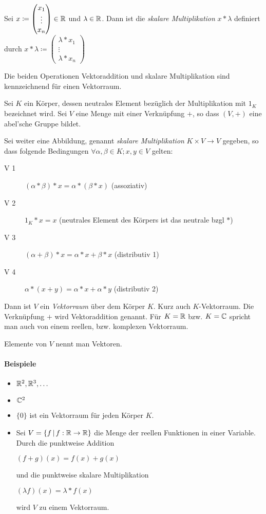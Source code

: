 Sei $x\coloneqq \begin{pmatrix}
  x_1\\
  \vdots\\
  x_n
\end{pmatrix} \in \mathbb{R}$ und $\lambda\in\mathbb{R}$. Dann ist die \emph{skalare Multiplikation} $x*\lambda$ definiert durch $x*\lambda \coloneqq \begin{pmatrix}
  \lambda* x_1\\
  \vdots\\
  \lambda* x_n
\end{pmatrix}$

Die beiden Operationen Vektoraddition und skalare Multiplikation sind kennzeichnend für einen Vektorraum.


Sei $K$ ein Körper, dessen neutrales Element bezüglich der Multiplikation mit $1_K$ bezeichnet wird. Sei $V$ eine Menge mit einer Verknüpfung $+$, so dass $(V,+)$ eine abel'sche Gruppe bildet.

Sei weiter eine Abbildung, genannt \emph{skalare Multiplikation} $K\times V\rightarrow V$ gegeben, so dass folgende Bedingungen $\forall \alpha,\beta \in K; x,y\in V$ gelten:

\begin{description}
  \item[V 1] $(\alpha*\beta)* x=\alpha*(\beta* x)$ (assoziativ)
  \item[V 2] $1_K* x = x$ (neutrales Element des Körpers ist das neutrale bzgl $*$)
  \item[V 3] $(\alpha+\beta)* x=\alpha * x + \beta* x$ (distributiv 1)
  \item[V 4] $\alpha* (x+y)=\alpha * x + \alpha* y$ (distributiv 2)
\end{description}
Dann ist $V$ ein \emph{Vektorraum} über dem Körper $K$. Kurz auch $K$-Vektorraum. Die Verknüpfung $+$ wird Vektoraddition genannt. Für $K=\mathbb{R}$ bzw. $K=\mathbb{C}$ spricht man auch von einem reellen, bzw. komplexen Vektorraum.

Elemente von $V$ nennt man Vektoren.

\paragraph{Beispiele}
\begin{multicols}{2}
  \begin{itemize}
    \item $\mathbb{R}^2, \mathbb{R}^3, \ldots$
    \item $\mathbb{C}^2$
    \item $\{0\}$ ist ein Vektorraum für jeden Körper $K$.
    \columnbreak
    \item Sei $V=\left\{ f \,\middle|\, f:\mathbb{R}\rightarrow\mathbb{R} \right\}$ die Menge der reellen Funktionen in einer Variable. Durch die punktweise Addition

    $(f+g)(x)=f(x)+g(x)$

    und die punktweise skalare Multiplikation

    $(\lambda f)(x)=\lambda* f(x)$

    wird $V$ zu einem Vektorraum.
  \end{itemize}
\end{multicols}


